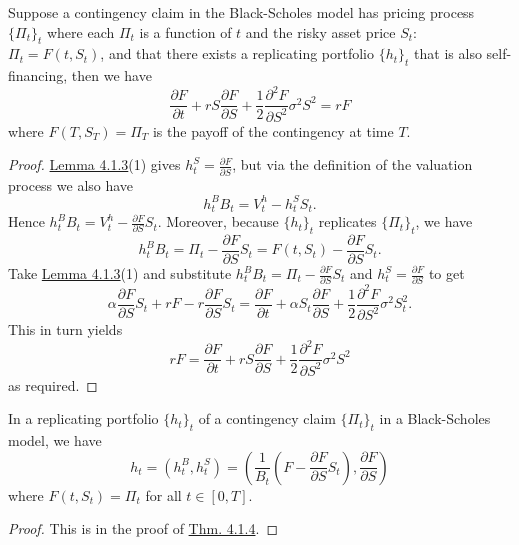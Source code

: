 \documentclass[11pt,fleqn]{book} %
\begin{document}
\begin{theorem} \label{thm:414}
Suppose a contingency claim in the Black-Scholes model has pricing process \(\{\Pi_t\}_t\) where each \(\Pi_t\) is a function of \(t\) and the risky asset price \(S_t\): \(\Pi_t = F(t, S_t)\), and that there exists a replicating portfolio \(\{h_t\}_t\) that is also self-financing, then we have
\[
\frac{\partial F}{\partial t} + rS\frac{\partial F}{\partial S} + \frac12\frac{\partial^2F}{\partial S^2}\sigma^2S^2 = rF
\]
where \(F(T, S_T) = \Pi_T\) is the payoff of the contingency at time \(T\).
\end{theorem}
\begin{proof}
\hyperref[lemma:413]{Lemma 4.1.3}(1) gives \(h_t^S = \frac{\partial F}{\partial S}\), but via the definition of the valuation process we also have
\[
h_t^BB_t = V_t^h - h_t^SS_t.
\]
\indent Hence \(h_t^BB_t = V_t^h - \frac{\partial F}{\partial S}S_t\). Moreover, because \(\{h_t\}_t\) replicates \(\{\Pi_t\}_t\), we have
\[
h_t^BB_t = \Pi_t - \frac{\partial F}{\partial S} S_t = F(t, S_t) - \frac{\partial F}{\partial S}S_t.
\]
\indent Take \hyperref[lemma:413]{Lemma 4.1.3}(1) and substitute \(h_t^BB_t = \Pi_t - \frac{\partial F}{\partial S}S_t\) and \(h_t^S = \frac{\partial F}{\partial S}\) to get
\[
\alpha\frac{\partial F}{\partial S}S_t + rF - r\frac{\partial F}{\partial S}S_t = \frac{\partial F}{\partial t} + \alpha S_t\frac{\partial F}{\partial S} + \frac12\frac{\partial^2F}{\partial S^2}\sigma^2S_t^2.
\]
\indent This in turn yields
\[
rF = \frac{\partial F}{\partial t} + rS\frac{\partial F}{\partial S} + \frac12\frac{\partial^2F}{\partial S^2}\sigma^2S^2
\]
as required.
\end{proof}

\begin{corollary} \label{cor:415}
In a replicating portfolio \(\{h_t\}_t\) of a contingency claim \(\{\Pi_t\}_t\) in a Black-Scholes model, we have
\[
h_t = (h_t^B, h_t^S) = \left(\frac{1}{B_t}\left(F - \frac{\partial F}{\partial S}S_t\right), \frac{\partial F}{\partial S}\right)
\]
where \(F(t, S_t) = \Pi_t\) for all \(t \in [0, T]\).
\end{corollary}
\begin{proof}
This is in the proof of \hyperref[thm:414]{Thm. 4.1.4}.
\end{proof}
\end{document}
